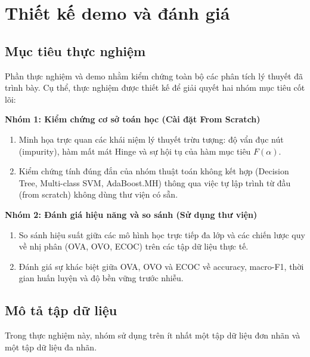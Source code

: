 \section{Thiết kế demo và đánh giá}

\subsection{Mục tiêu thực nghiệm}
\label{ssec:exp_objectives}

Phần thực nghiệm và demo nhằm kiểm chứng toàn bộ các phân tích lý thuyết đã trình bày. Cụ thể, thực nghiệm được thiết kế để giải quyết hai nhóm mục tiêu cốt lõi:

\textbf{Nhóm 1: Kiểm chứng cơ sở toán học (Cài đặt From Scratch)}
\begin{enumerate}[leftmargin=2em]
  \item Minh họa trực quan các khái niệm lý thuyết trừu tượng: độ vẩn đục nút (impurity), hàm mất mát Hinge và sự hội tụ của hàm mục tiêu $F(\alpha)$.
  \item Kiểm chứng tính đúng đắn của nhóm thuật toán không kết hợp (Decision Tree, Multi-class SVM, AdaBoost.MH) thông qua việc tự lập trình từ đầu (from scratch) không dùng thư viện có sẵn.
\end{enumerate}

\textbf{Nhóm 2: Đánh giá hiệu năng và so sánh (Sử dụng thư viện)}
\begin{enumerate}[leftmargin=2em]
  \item So sánh hiệu suất giữa các mô hình học trực tiếp đa lớp và các chiến lược quy về nhị phân (OVA, OVO, ECOC) trên các tập dữ liệu thực tế.
  \item Đánh giá sự khác biệt giữa OVA, OVO và ECOC về accuracy, macro-F1, thời gian huấn luyện và độ bền vững trước nhiễu.
\end{enumerate}

\subsection{Mô tả tập dữ liệu}

Trong thực nghiệm này, nhóm sử dụng trên ít nhất một tập dữ liệu đơn nhãn và một tập dữ liệu đa nhãn.

